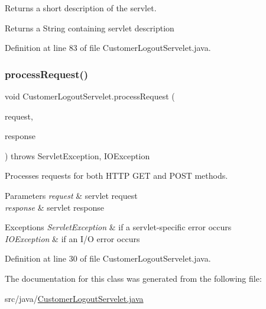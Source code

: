 Returns a short description of the servlet.

\begin{DoxyReturn}{Returns}
a String containing servlet description 
\end{DoxyReturn}


Definition at line 83 of file Customer\+Logout\+Servelet.\+java.

\mbox{\label{class_customer_logout_servelet_ae054a92974c047b987a6b978da7933bf}} 
\subsubsection{\texorpdfstring{processRequest()}{processRequest()}}
{\footnotesize\ttfamily void Customer\+Logout\+Servelet.\+process\+Request (\begin{DoxyParamCaption}\item[{Http\+Servlet\+Request}]{request,  }\item[{Http\+Servlet\+Response}]{response }\end{DoxyParamCaption}) throws Servlet\+Exception, I\+O\+Exception\hspace{0.3cm}{\ttfamily [protected]}}

Processes requests for both H\+T\+TP {\ttfamily G\+ET} and {\ttfamily P\+O\+ST} methods.


\begin{DoxyParams}{Parameters}
{\em request} & servlet request \\
\hline
{\em response} & servlet response \\
\hline
\end{DoxyParams}

\begin{DoxyExceptions}{Exceptions}
{\em Servlet\+Exception} & if a servlet-\/specific error occurs \\
\hline
{\em I\+O\+Exception} & if an I/O error occurs \\
\hline
\end{DoxyExceptions}


Definition at line 30 of file Customer\+Logout\+Servelet.\+java.



The documentation for this class was generated from the following file\+:\begin{DoxyCompactItemize}
\item 
src/java/\mbox{\hyperlink{_customer_logout_servelet_8java}{Customer\+Logout\+Servelet.\+java}}\end{DoxyCompactItemize}

